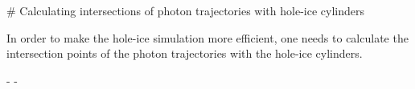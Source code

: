 
# Calculating intersections of photon trajectories with hole-ice cylinders

In order to make the hole-ice simulation more efficient, one needs to calculate the intersection points of the photon trajectories with the hole-ice cylinders.


- 
- 

\lipsum
